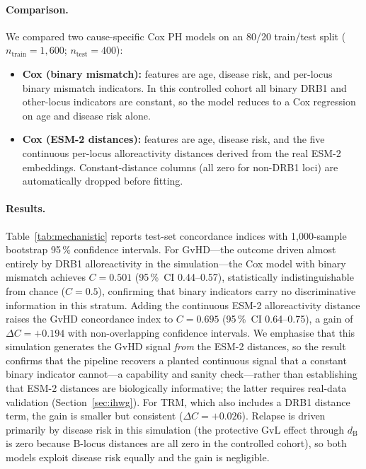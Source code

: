 \documentclass[11pt,a4paper]{article}
\begin{document}
\paragraph{Comparison.}
We compared two cause-specific Cox PH models on an 80/20 train/test split
($n_{\mathrm{train}}=1{,}600$; $n_{\mathrm{test}}=400$):
\begin{itemize}
  \item \textbf{Cox (binary mismatch):} features are age, disease risk, and
    per-locus binary mismatch indicators.  In this controlled cohort all binary
    DRB1 and other-locus indicators are constant, so the model reduces to a
    Cox regression on age and disease risk alone.
  \item \textbf{Cox (ESM-2 distances):} features are age, disease risk, and the
    five continuous per-locus alloreactivity distances derived from the real
    ESM-2 embeddings.  Constant-distance columns (all zero for non-DRB1 loci)
    are automatically dropped before fitting.
\end{itemize}

\paragraph{Results.}
Table~\ref{tab:mechanistic} reports test-set concordance indices with 1{,}000-sample
bootstrap 95\,\% confidence intervals.  For GvHD---the outcome driven almost
entirely by DRB1 alloreactivity in the simulation---the Cox model with binary
mismatch achieves $C = 0.501$ (95\,\%~CI 0.44--0.57), statistically
indistinguishable from chance ($C = 0.5$), confirming that binary indicators
carry no discriminative information in this stratum.  Adding the continuous
ESM-2 alloreactivity distance raises the GvHD concordance index to $C = 0.695$
(95\,\%~CI 0.64--0.75), a gain of $\Delta C = +0.194$ with non-overlapping
confidence intervals.  We emphasise that this simulation generates the GvHD
signal \emph{from} the ESM-2 distances, so the result confirms that the
pipeline recovers a planted continuous signal that a constant binary indicator
cannot---a capability and sanity check---rather than establishing that ESM-2
distances are biologically informative; the latter requires real-data
validation (Section~\ref{sec:ihwg}).  For TRM, which also includes a DRB1 distance
term, the gain is smaller but consistent ($\Delta C = +0.026$).  Relapse is
driven primarily by disease risk in this simulation (the protective GvL effect
through $d_{\mathrm{B}}$ is zero because B-locus distances are all zero in the
controlled cohort), so both models exploit disease risk equally and the gain is
negligible.
\end{document}
